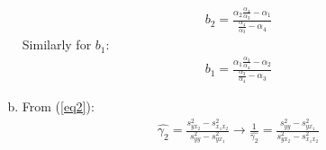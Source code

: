 \documentclass[a4paper]{article}
\begin{document}
\begin{enumerate}[(a)]
	\begin{align*}
	b_2 = \frac{\alpha_2\frac{\alpha_4}{\alpha_3} - \alpha_1}{\frac{\alpha_4}{\alpha_3} - \alpha_4}
	\end{align*}
	Similarly for $b_1$:
	\begin{align*}
	b_1 = \frac{\alpha_1\frac{\alpha_3}{\alpha_4} - \alpha_2}{\frac{\alpha_3}{\alpha_4} - \alpha_3}
	\end{align*}
	\item From (\ref{eq2}):
	\begin{align*}
	\hat{\gamma_2} = \frac{s^2_{yx_2} - s^2_{x_1x_2}}{s^2_{yy} - s^2_{yx_1}} \to \frac{1}{\hat{\gamma_2}} = \frac{s^2_{yy} - s^2_{yx_1}}{s^2_{yx_2} - s^2_{x_1x_2}}
	\end{align*}
\end{enumerate}
\end{document}
